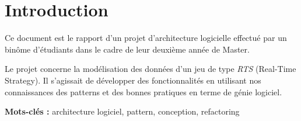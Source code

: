 \chapter{Introduction}

Ce document est le rapport d'un projet d'architecture logicielle effectué par un binôme d'étudiants dans le cadre de leur deuxième année de Master.

Le projet concerne la modélisation des données d'un jeu de type \emph{RTS} (Real-Time Strategy). Il s'agissait de développer des fonctionnalités en utilisant nos connaissances des patterns et des bonnes pratiques en terme de génie logiciel.

\vfill

\textbf{Mots-clés :} architecture logiciel, pattern, conception, refactoring

\vfill
